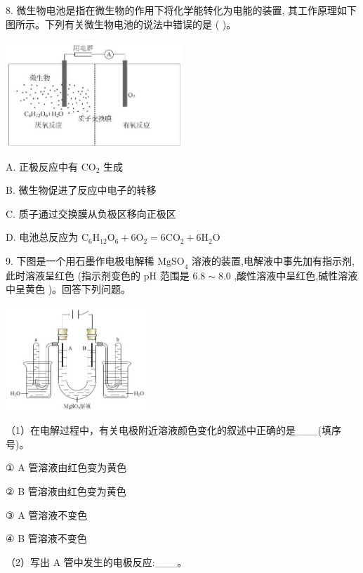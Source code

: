 \documentclass[10pt]{article}
\begin{document}
8. 微生物电池是指在微生物的作用下将化学能转化为电能的装置, 其工作原理如下图所示。下列有关微生物电池的说法中错误的是 ( )。

\begin{center}
\includegraphics[max width=0.5\textwidth]{images/0190da9d-8bfd-732f-bc2c-0b21d0f13b91_125_294012.jpg}
\end{center}

A. 正极反应中有 \({\mathrm{{CO}}}_{2}\) 生成

B. 微生物促进了反应中电子的转移

C. 质子通过交换膜从负极区移向正极区

D. 电池总反应为 \({\mathrm{C}}_{6}{\mathrm{H}}_{12}{\mathrm{O}}_{6} + 6{\mathrm{O}}_{2} = 6{\mathrm{{CO}}}_{2} + 6{\mathrm{H}}_{2}\mathrm{O}\)

9. 下图是一个用石墨作电极电解稀 \({\mathrm{{MgSO}}}_{4}\) 溶液的装置,电解液中事先加有指示剂,此时溶液呈红色 (指示剂变色的 \(\mathrm{{pH}}\) 范围是 \({6.8} \sim {8.0}\) ,酸性溶液中呈红色,碱性溶液中呈黄色 )。回答下列问题。

\begin{center}
\includegraphics[max width=0.4\textwidth]{images/0190da9d-8bfd-732f-bc2c-0b21d0f13b91_125_627942.jpg}
\end{center}

（1）在电解过程中，有关电极附近溶液颜色变化的叙述中正确的是\_\_\_(填序号)。

① A 管溶液由红色变为黄色

② B 管溶液由红色变为黄色

③ A 管溶液不变色

④ B 管溶液不变色

（2）写出 \(\mathrm{A}\) 管中发生的电极反应:\_\_\_。
\end{document}

